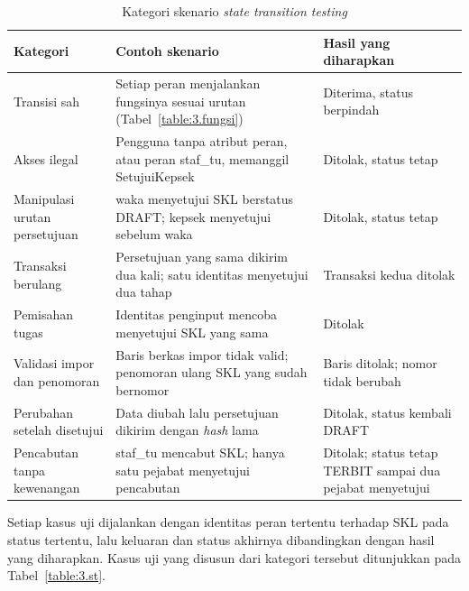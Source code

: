 \begin{table}[H]
    \centering
    \caption{Kategori skenario \textit{state transition testing}}
    \label{table:3.skenario}
    \footnotesize
    \renewcommand{\arraystretch}{1.25}
    \begin{tabular}{|>{\raggedright\arraybackslash}p{}|>{\raggedright\arraybackslash}p{}|>{\raggedright\arraybackslash}p{}|}
        \hline
        \textbf{Kategori} & \textbf{Contoh skenario} & \textbf{Hasil yang diharapkan} \\
        \hline
        Transisi sah & Setiap peran menjalankan fungsinya sesuai urutan (Tabel~\ref{table:3.fungsi}) & Diterima, status berpindah \\
        \hline
        Akses ilegal & Pengguna tanpa atribut peran, atau peran staf\_tu, memanggil SetujuiKepsek & Ditolak, status tetap \\
        \hline
        Manipulasi urutan persetujuan & waka menyetujui SKL berstatus DRAFT; kepsek menyetujui sebelum waka & Ditolak, status tetap \\
        \hline
        Transaksi berulang & Persetujuan yang sama dikirim dua kali; satu identitas menyetujui dua tahap & Transaksi kedua ditolak \\
        \hline
        Pemisahan tugas & Identitas penginput mencoba menyetujui SKL yang sama & Ditolak \\
        \hline
        Validasi impor dan penomoran & Baris berkas impor tidak valid; penomoran ulang SKL yang sudah bernomor & Baris ditolak; nomor tidak berubah \\
        \hline
        Perubahan setelah disetujui & Data diubah lalu persetujuan dikirim dengan \textit{hash} lama & Ditolak, status kembali DRAFT \\
        \hline
        Pencabutan tanpa kewenangan & staf\_tu mencabut SKL; hanya satu pejabat menyetujui pencabutan & Ditolak; status tetap TERBIT sampai dua pejabat menyetujui \\
        \hline
    \end{tabular}
\end{table}

Setiap kasus uji dijalankan dengan identitas peran tertentu terhadap SKL pada status tertentu, lalu keluaran dan status akhirnya dibandingkan dengan hasil yang diharapkan. Kasus uji yang disusun dari kategori tersebut ditunjukkan pada Tabel~\ref{table:3.st}.

